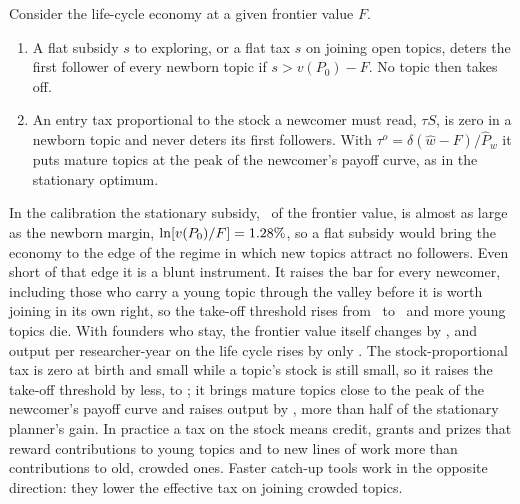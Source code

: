 \begin{proposition}\label{prop:policy}
Consider the life-cycle economy at a given frontier value $F$.
\begin{enumerate}[label=(\roman*)]
\item A flat subsidy $s$ to exploring, or a flat tax $s$ on joining open topics, deters the first follower of every newborn topic if $s>v(P_0)-F$. No topic then takes off.
\item An entry tax proportional to the stock a newcomer must read, $\tau S$, is zero in a newborn topic and never deters its first followers. With $\tau^o=\delta(\hat w-F)/\hat P_w$ it puts mature topics at the peak of the newcomer's payoff curve, as in the stationary optimum.
\end{enumerate}
\end{proposition}

In the calibration the stationary subsidy, \calSubsidy\ of the frontier value,
is almost as large as the newborn margin, $\ln[v(P_0)/F]=1.28\%$, so a
flat subsidy would bring the economy to the edge of the regime in which new
topics attract no followers. Even short of that edge it is a blunt instrument.
It raises the bar for every newcomer, including those who carry a young topic
through the valley before it is worth joining in its own right, so the take-off
threshold rises from \calPolLFGtakeoff\ to \calPolSubsidyGtakeoff\ and more
young topics die. With founders who stay, the frontier value itself changes by
\calPolSubsidyF, and output per researcher-year on the life cycle rises by only
\calPolSubsidyGain. The stock-proportional tax is zero at birth and small while
a topic's stock is still small, so it raises the take-off threshold by less, to
\calPolTaxGtakeoff; it brings mature topics close to the peak of the newcomer's
payoff curve and raises output by \calPolTaxGain, more than half of the
stationary planner's gain. In
practice a tax on the stock means credit, grants and prizes that reward
contributions to young topics and to new lines of work more than
contributions to old, crowded ones. Faster catch-up tools work in the opposite
direction: they lower the effective tax on joining crowded topics.

